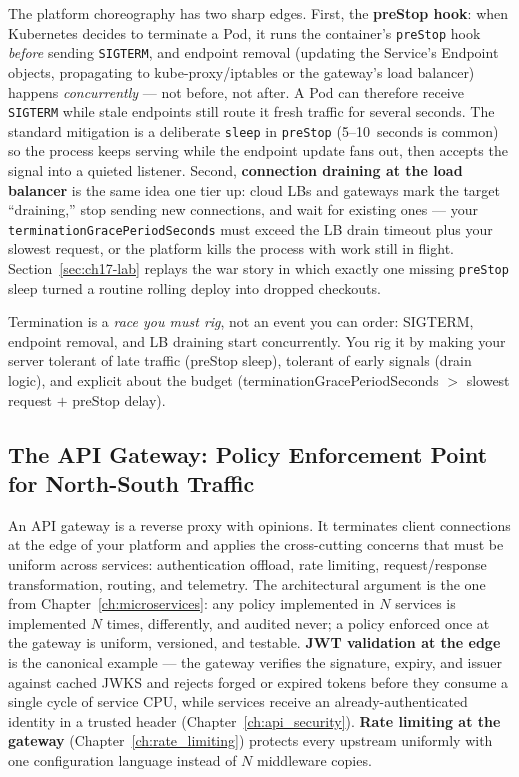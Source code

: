 The platform choreography has two sharp edges. First, the
\textbf{preStop hook}: when Kubernetes decides to terminate a Pod, it
runs the container's \texttt{preStop} hook \emph{before} sending
\texttt{SIGTERM}, and endpoint removal (updating the Service's Endpoint
objects, propagating to kube-proxy/iptables or the gateway's load
balancer) happens \emph{concurrently} --- not before, not after. A Pod
can therefore receive \texttt{SIGTERM} while stale endpoints still route
it fresh traffic for several seconds. The standard mitigation is a
deliberate \texttt{sleep} in \texttt{preStop} (5--10~seconds is common)
so the process keeps serving while the endpoint update fans out, then
accepts the signal into a quieted listener. Second,
\textbf{connection draining at the load balancer} is the same idea one
tier up: cloud LBs and gateways mark the target ``draining,'' stop
sending new connections, and wait for existing ones --- your
\texttt{terminationGracePeriodSeconds} must exceed the LB drain timeout
plus your slowest request, or the platform kills the process with work
still in flight. Section~\ref{sec:ch17-lab} replays the war story in
which exactly one missing \texttt{preStop} sleep turned a routine rolling
deploy into dropped checkouts.

\begin{keyconceptbox}
Termination is a \emph{race you must rig}, not an event you can order:
SIGTERM, endpoint removal, and LB draining start concurrently. You rig it
by making your server tolerant of late traffic (preStop sleep), tolerant
of early signals (drain logic), and explicit about the budget
(terminationGracePeriodSeconds $>$ slowest request $+$ preStop delay).
\end{keyconceptbox}

\subsection{The API Gateway: Policy Enforcement Point for North-South Traffic}
\label{sec:ch17-gateway}

An API gateway is a reverse proxy with opinions. It terminates client
connections at the edge of your platform and applies the cross-cutting
concerns that must be uniform across services: authentication offload,
rate limiting, request/response transformation, routing, and telemetry.
The architectural argument is the one from Chapter~\ref{ch:microservices}:
any policy implemented in $N$ services is implemented $N$ times,
differently, and audited never; a policy enforced once at the gateway is
uniform, versioned, and testable. \textbf{JWT validation at the edge} is
the canonical example --- the gateway verifies the signature, expiry, and
issuer against cached JWKS and rejects forged or expired tokens before
they consume a single cycle of service CPU, while services receive an
already-authenticated identity in a trusted header
(Chapter~\ref{ch:api_security}). \textbf{Rate limiting at the gateway}
(Chapter~\ref{ch:rate_limiting}) protects every upstream uniformly with
one configuration language instead of $N$ middleware copies.

